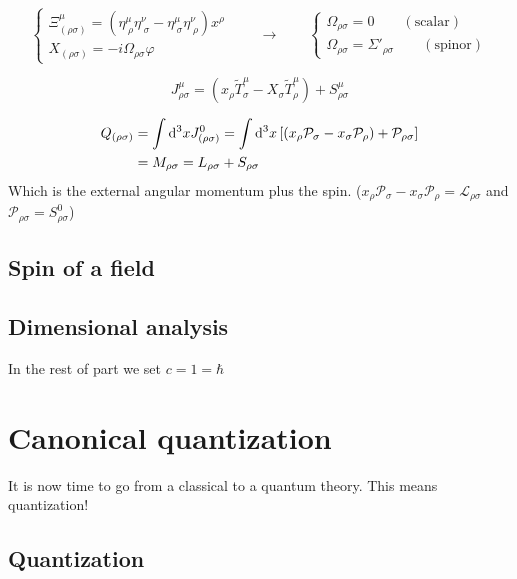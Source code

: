\[ \begin{cases}
\Xi^\mu_{(\rho\sigma)} = \left(\eta^\mu_{\;\rho}\eta^\nu_{\;\sigma}-\eta^\mu_{\;\sigma}\eta^\nu_{\;\rho}\right)x^\rho \\
X_{(\rho\sigma)} = -i\Omega_{\rho\sigma}\varphi
\end{cases} \qquad \to \qquad \begin{cases}
\Omega_{\rho\sigma} = 0 \qquad (\text{scalar}) \\
\Omega_{\rho\sigma} = \Sigma'_{\rho\sigma} \qquad (\text{spinor})
\end{cases}\]

\[ J^\mu_{\rho\sigma} = \left(x_\rho\tilde{T}^\mu_\sigma - X_\sigma\tilde{T}^\mu_\rho\right) + S^\mu_{\rho\sigma} \]

\begin{align*}
Q_{(\rho\sigma)} &= \int \operatorname{d \!}{^3x}J^0_{(\rho\sigma)} = \int \operatorname{d \!}{^3x}\left[\left(x_\rho\mathcal{P}_\sigma - x_\sigma\mathcal{P}_\rho\right) + \mathcal{P}_{\rho\sigma}\right] \\
&= M_{\rho\sigma} = L_{\rho\sigma} + S_{\rho\sigma}
\end{align*}
Which is the external angular momentum plus the spin. ($x_\rho\mathcal{P}_\sigma - x_\sigma\mathcal{P}_\rho = \mathcal{L}_{\rho\sigma}$ and $\mathcal{P}_{\rho\sigma} = S^0_{\rho\sigma}$)

\section{Spin of a field}


\section{Dimensional analysis}
In the rest of part we set $c = 1 = \hbar $


\chapter{Canonical quantization}
It is now time to go from a classical to a quantum theory. This means quantization!
\section{Quantization}
